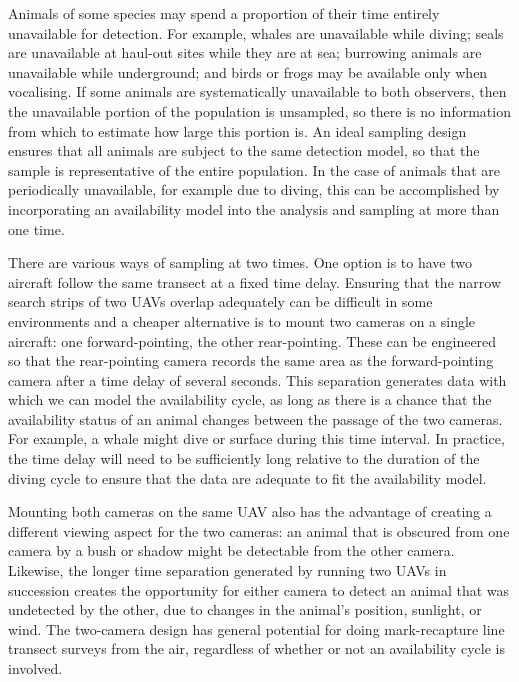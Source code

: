 \documentclass[useAMS, usenatbib, referee]{biom}\usepackage[]{graphicx}\usepackage[]{color}
\begin{document}
Animals of some species may spend a proportion of their time entirely unavailable for detection. For example, whales are unavailable while diving; seals are unavailable at haul-out sites while they are at sea; burrowing animals are unavailable while underground; and birds or frogs may be available only when vocalising. If some animals are systematically unavailable to both observers, then the unavailable portion of the population is unsampled, so there is no information from which to estimate how large this portion is. %
An ideal sampling design ensures that all animals are subject to the same detection model, so that the sample is representative of the entire population. In the case of animals that are periodically unavailable, for example due to diving, this can be accomplished by incorporating an availability model into the analysis and sampling at more than one time.

There are various ways of sampling at two times. One option is to have two aircraft follow the same transect at a fixed time delay. Ensuring that the narrow search strips of two UAVs overlap adequately can be difficult in some environments and a cheaper alternative is to mount two cameras on a single aircraft: one forward-pointing, the other rear-pointing. These can be engineered so that the rear-pointing camera records the same area as the forward-pointing camera after a time delay of several seconds. This separation generates data with which we can model the availability cycle, as long as there is a chance that the availability status of an animal changes between the passage of the two cameras. For example, a whale might dive or surface during this time interval. In practice, the time delay will need to be sufficiently long relative to the duration of the diving cycle to ensure that the data are adequate to fit the availability model.

Mounting both cameras on the same UAV also has the advantage of creating a different viewing aspect for the two cameras: an animal that is obscured from one camera by a bush or shadow might be detectable from the other camera. Likewise, the longer time separation generated by running two UAVs in succession creates the opportunity for either camera to detect an animal that was undetected by the other, due to changes in the animal's position, sunlight, or wind. The two-camera design has general potential for doing mark-recapture line transect surveys from the air, regardless of whether or not an availability cycle is involved.
\end{document}
